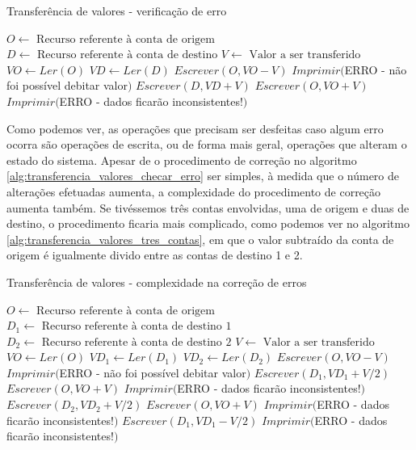\documentclass[11pt,twoside,a4paper]{book}
\begin{document}
\begin{algorithm}
\caption{Transferência de valores - verificação de erro}
\label{alg:transferencia_valores_checar_erro}
\begin{algorithmic}[1]
\State $O \gets \text{ Recurso referente à conta de origem}$
\State $D \gets \text{ Recurso referente à conta de destino}$
\State $V \gets \text{ Valor a ser transferido}$
\State $VO \gets Ler(O)$
    \State $VD \gets Ler(D)$
    \State $Escrever(O, VO - V)$
        \State $Imprimir($ERRO - não foi possível debitar valor$)$
    \Else
        \State $Escrever(D, VD + V)$
            \State $Escrever(O, VO + V)$
                \State $Imprimir($ERRO - dados ficarão inconsistentes!$)$
            \EndIf
        \EndIf
    \EndIf
\EndIf
\end{algorithmic}
\end{algorithm}

Como podemos ver, as operações que precisam ser desfeitas caso algum erro ocorra são operações de escrita, ou de forma mais geral, operações que alteram o estado do sistema. Apesar de o procedimento de correção no algoritmo \ref{alg:transferencia_valores_checar_erro} ser simples, à medida que o número de alterações efetuadas aumenta, a complexidade do procedimento de correção aumenta também. Se tivéssemos três contas envolvidas, uma de origem e duas de destino, o procedimento ficaria mais complicado, como podemos ver no algoritmo \ref{alg:transferencia_valores_tres_contas}, em que o valor subtraído da conta de origem é igualmente divido entre as contas de destino 1 e 2.

\begin{algorithm}
\caption{Transferência de valores - complexidade na correção de erros}
\label{alg:transferencia_valores_tres_contas}
\begin{algorithmic}[1]
\State $O \gets \text{ Recurso referente à conta de origem}$
\State $D_1 \gets \text{ Recurso referente à conta de destino 1}$
\State $D_2 \gets \text{ Recurso referente à conta de destino 2}$
\State $V \gets \text{ Valor a ser transferido}$
\State $VO \gets Ler(O)$
    \State $VD_1 \gets Ler(D_1)$
    \State $VD_2 \gets Ler(D_2)$
    \State $Escrever(O, VO - V)$
        \State $Imprimir($ERRO - não foi possível debitar valor$)$
    \Else
        \State $Escrever(D_1, VD_1 + V/2)$
            \State $Escrever(O, VO + V)$
                \State $Imprimir($ERRO - dados ficarão inconsistentes!$)$
            \EndIf
        \Else
            \State $Escrever(D_2, VD_2 + V/2)$
                \State $Escrever(O, VO + V)$
                    \State $Imprimir($ERRO - dados ficarão inconsistentes!$)$
                \EndIf
                \State $Escrever(D_1, VD_1 - V/2)$
                    \State $Imprimir($ERRO - dados ficarão inconsistentes!$)$
                \EndIf
            \EndIf
        \EndIf
    \EndIf
\EndIf
\end{algorithmic}
\end{algorithm}
\end{document}
